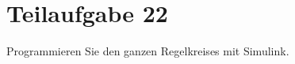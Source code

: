 \section{Teilaufgabe 22}
\begin{aufgabe}
    Programmieren Sie den ganzen Regelkreises mit Simulink.
\end{aufgabe}
